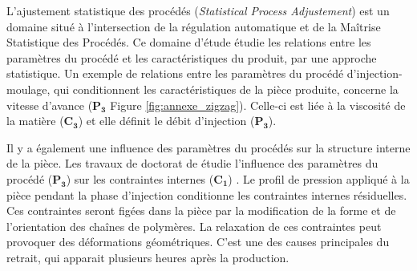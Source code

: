 L’ajustement statistique des procédés (\textit{Statistical Process Adjustement}) est un domaine situé à l’intersection de la régulation automatique et de la Maîtrise Statistique des Procédés.
Ce domaine d'étude étudie les relations entre les paramètres du procédé et les caractéristiques du produit, par une approche statistique.
Un exemple de relations entre les paramètres du procédé d’injection-moulage, qui conditionnent les caractéristiques de la pièce produite, concerne la vitesse d'avance ($\boldsymbol{P_3}$ Figure \ref{fig:annexe_zigzag}).
Celle-ci est liée à la viscosité de la matière ($\boldsymbol{C_3}$) et elle définit le débit d’injection ($\boldsymbol{P_3}$).

Il y a également une influence des paramètres du procédés sur la structure interne de la pièce.
Les travaux de doctorat de \citeauthor{giroud_mesure_2001} étudie l'influence des paramètres du procédé ($\boldsymbol{P_3}$) sur les contraintes internes ($\boldsymbol{C_1}$) \cite{giroud_mesure_2001}.
Le profil de pression appliqué à la pièce pendant la phase d'injection conditionne les contraintes internes résiduelles.
Ces contraintes seront figées dans la pièce par la modification de la forme et de l'orientation des chaînes de polymères.
La relaxation de ces contraintes peut provoquer des déformations géométriques.
C'est une des causes principales du retrait, qui apparait plusieurs heures après la production.


